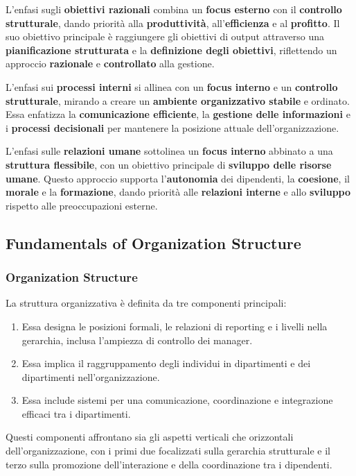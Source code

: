 \documentclass{article}
\begin{document}
L’enfasi sugli \textbf{obiettivi razionali} combina un \textbf{focus esterno} con il \textbf{controllo strutturale}, dando priorità alla \textbf{produttività}, all’\textbf{efficienza} e al \textbf{profitto}. Il suo obiettivo principale è raggiungere gli obiettivi di output attraverso una \textbf{pianificazione strutturata} e la \textbf{definizione degli obiettivi}, riflettendo un approccio \textbf{razionale} e \textbf{controllato} alla gestione.

L’enfasi sui \textbf{processi interni} si allinea con un \textbf{focus interno} e un \textbf{controllo strutturale}, mirando a creare un \textbf{ambiente organizzativo stabile} e ordinato. Essa enfatizza la \textbf{comunicazione efficiente}, la \textbf{gestione delle informazioni} e i \textbf{processi decisionali} per mantenere la posizione attuale dell’organizzazione.

L’enfasi sulle \textbf{relazioni umane} sottolinea un \textbf{focus interno} abbinato a una \textbf{struttura flessibile}, con un obiettivo principale di \textbf{sviluppo delle risorse umane}. Questo approccio supporta l’\textbf{autonomia} dei dipendenti, la \textbf{coesione}, il \textbf{morale} e la \textbf{formazione}, dando priorità alle \textbf{relazioni interne} e allo \textbf{sviluppo} rispetto alle preoccupazioni esterne.


\subsection{Fundamentals of Organization Structure}

\subsubsection{Organization Structure}

La struttura organizzativa è definita da tre componenti principali:
\begin{enumerate}
    \item Essa designa le posizioni formali, le relazioni di reporting e i livelli nella gerarchia, inclusa l'ampiezza di controllo dei manager.
    \item Essa implica il raggruppamento degli individui in dipartimenti e dei dipartimenti nell’organizzazione.
    \item Essa include sistemi per una comunicazione, coordinazione e integrazione efficaci tra i dipartimenti.
\end{enumerate}

Questi componenti affrontano sia gli aspetti verticali che orizzontali dell’organizzazione, con i primi due focalizzati sulla gerarchia strutturale e il terzo sulla promozione dell’interazione e della coordinazione tra i dipendenti.
\end{document}
